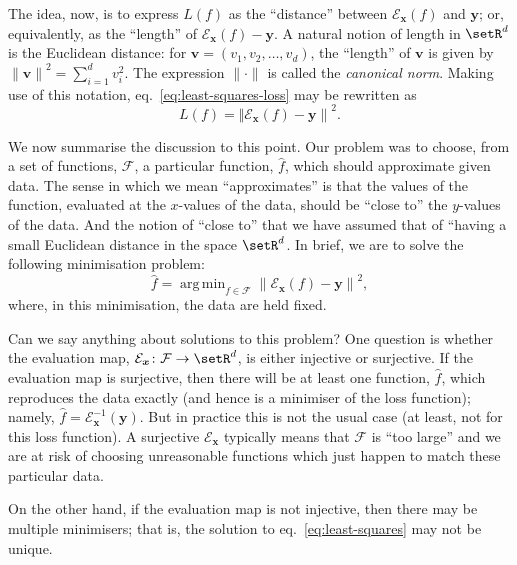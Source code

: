 \documentclass[10pt, a4paper]{article}
\DeclareMathOperator*{\argmin}{arg\,min}
\begin{document}
The idea, now, is to express $L(f)$ as the “distance” between
$\mathcal{E}_{\bm{x}}(f)$ and $\bm{y}$; or, equivalently, as the “length” of
$\mathcal{E}_{\bm{x}}(f)-\bm{y}$. A natural notion of length in
$\setR^d$ is the Euclidean distance: for
$\bm{v}=(v_1, v_2, \dotsc, v_d)$, the “length” of $\bm{v}$ is given by
${\lVert \bm{v} \rVert}^2 = \sum_{i=1}^d v_i^2$. The expression
$\lVert\cdot\rVert$ is called the \emph{canonical norm}.  Making use of
this notation, eq.~\eqref{eq:least-squares-loss} may be rewritten as
\begin{equation}
  \label{eq:norm-loss}
  L(f) = {\Vert \mathcal{E}_{\bm{x}}(f) - \bm{y}\rVert }^2.
\end{equation}

We now summarise the discussion to this point. Our problem was to
choose, from a set of functions, $\mathcal{F}$, a particular function,
$\hat{f}$, which should approximate given data. The sense in which we
mean “approximates” is that the values of the function, evaluated at
the $x$-values of the data, should be “close to” the $y$-values of the
data. And the notion of “close to” that we have assumed that of
“having a small Euclidean distance in the space $\setR^d$. In brief,
we are to solve the following minimisation problem:
\begin{equation}
  \label{eq:least-squares}
  \hat{f} = \argmin_{f\in\mathcal{F}} {\lVert \mathcal{E}_{\bm{x}}(f) - \bm{y}\rVert}^2,
\end{equation}
where, in this minimisation, the data are held fixed.

Can we say anything about solutions to this problem? One question is
whether the evaluation map,
$\mathcal{E}_{\bm{x}}\colon \mathcal{F} \to \setR^d$, is either injective or surjective. If
the evaluation map is surjective, then there will be at least one
function, $\hat{f}$, which reproduces the data exactly (and hence is a
minimiser of the loss function); namely,
$\hat{f}=\mathcal{E}_{\bm{x}}^{-1}(\bm{y})$. But in practice this is not the
usual case (at least, not for this loss function). A surjective
$\mathcal{E}_{\bm{x}}$ typically means that $\mathcal{F}$ is “too large” and we are at
risk of choosing unreasonable functions which just happen to match
these particular data.

On the other hand, if the evaluation map is not injective, then there
may be multiple minimisers; that is, the solution to
eq.~\eqref{eq:least-squares} may not be unique.
\end{document}

